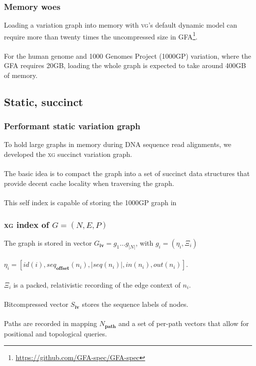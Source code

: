 \documentclass{beamer}
\begin{document}
\begin{frame}
  \frametitle{Memory woes}
  Loading a variation graph into memory with \textsc{vg}'s default dynamic model can require more than twenty times the uncompressed size in GFA\footnote{\url{https://github.com/GFA-spec/GFA-spec}}.
  \\~\\
  For the human genome and 1000 Genomes Project (1000GP) variation, where the GFA requires 20GB, loading the whole graph is expected to take around 400GB of memory.
\end{frame}

\subsection{Static, succinct}
\begin{frame}[fragile]
  \frametitle{Performant static variation graph}
  To hold large graphs in memory during DNA sequence read alignments, we developed the \textsc{xg} succinct variation graph.
  \\~\\
  The basic idea is to compact the graph into a set of succinct data structures that provide decent cache locality when traversing the graph.
  \\~\\
  This self index is capable of storing the 1000GP graph in 
\end{frame}

\begin{frame}
  \frametitle{\textsc{xg} index of $G = (N, E, P)$}
  The graph is stored in vector $G_\mathbf{iv} = g_1 \ldots g_{|N|}$, with $g_i = ( \eta_i, \Xi_i)$
  \\~\\
  $\eta_i = \left[ id(i), seq_\mathbf{offset}(n_i), |seq(n_i)|, in(n_i), out(n_i) \right]$.
  \\~\\
  $\Xi_i$ is a packed, relativistic recording of the edge context of $n_i$.
  \\~\\
  Bitcompressed vector $S_\mathbf{iv}$ stores the sequence labels of nodes.
  \\~\\
  Paths are recorded in mapping $N_\mathbf{path}$ and a set of per-path vectors that allow for positional and topological queries.
\end{frame}
\end{document}
